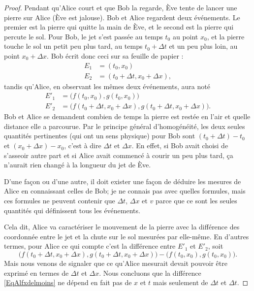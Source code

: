 \begin{proof}
Pendant qu'Alice court et que Bob la regarde, Ève tente de lancer une pierre sur Alice (Ève est jalouse). Bob et Alice regardent deux événements. Le premier est la pierre qui quitte la main de Ève, et le second est la pierre qui percute le sol. Pour Bob, le jet s'est passée au temps $t_0$ au point $x_0$, et la pierre touche le sol un petit peu plus tard, au temps $t_0+\Delta t$ et un peu plus loin, au point $x_0+\Delta x$. Bob écrit donc ceci sur sa feuille de papier :
\[ 
\begin{split}
E_1&=(t_0,x_0)\\
E_2&=(t_0+\Delta t,x_0+\Delta x),
\end{split}  
\]
tandis qu'Alice, en observant les mêmes deux événements, aura noté
\[ 
\begin{split}
E'_1&=\big( f(t_0,x_0),g(t_0,x_0) \big) \\
E'_2&=\big( f(t_0+\Delta t,x_0+\Delta x), g(t_0+\Delta t,x_0+\Delta x) \big).
\end{split}  
\]
Bob et Alice se demandent combien de temps la pierre est restée en l'air et quelle distance elle a parcourue. Par le principe général d'homogénéité, les deux seules quantités pertinentes (qui ont un sens physique) pour Bob sont $(t_0+\Delta t)-t_0$ et $(x_0+\Delta x)-x_0$, c'est à dire $\Delta t$ et $\Delta x$. En effet, si Bob avait choisi de s'asseoir autre part et si Alice avait commencé à courir un peu plus tard, ça n'aurait rien changé à la longueur du jet de Ève.

D'une façon ou d'une autre, il doit exister une façon de déduire les mesures de Alice en connaissant celles de Bob; je ne connais pas avec quelles formules, mais ces formules ne peuvent contenir que $\Delta t$, $\Delta x$ et $v$ parce que ce sont les seules quantités qui définissent tous les événements.

Cela dit, Alice va caractériser le mouvement de la pierre avec la différence des coordonnée entre le jet et la chute sur le sol mesurées par elle-même. En d'autres termes, pour Alice ce qui compte c'est la différence entre $E'_1$ et $E'_2$, soit
\begin{equation}	\label{EqAlfxdelmoins}
   \big( f(t_0+\Delta t,x_0+\Delta x), g(t_0+\Delta t,x_0+\Delta x) \big)-\big( f(t_0,x_0),g(t_0,x_0) \big).
\end{equation} 
Mais nous venons de signaler que ce qu'Alice mesurait devait pouvoir être exprimé en termes de $\Delta t$ et $\Delta x$. Nous concluons que la différence \eqref{EqAlfxdelmoins} ne dépend en fait pas de $x$ et $t$ mais seulement de $\Delta t$ et $\Delta t$.


\end{proof}

